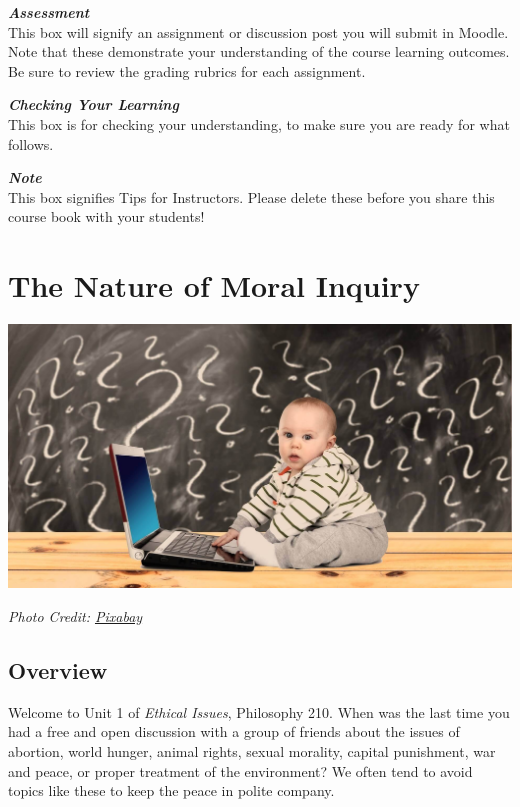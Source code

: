 \documentclass[
]{book}
\begin{document}
\begin{assessment}
\textbf{\emph{Assessment}}\\
This box will signify an assignment or discussion post you will submit in Moodle. Note that these demonstrate your understanding of the course learning outcomes. Be sure to review the grading rubrics for each assignment.
\end{assessment}

\begin{progress}
\textbf{\emph{Checking Your Learning}}\\
This box is for checking your understanding, to make sure you are ready for what follows.
\end{progress}

\begin{feedback}
\textbf{\emph{Note}}\\
This box signifies Tips for Instructors. Please delete these before you share this course book with your students!
\end{feedback}

\hypertarget{the-nature-of-moral-inquiry}{%
\chapter{The Nature of Moral Inquiry}\label{the-nature-of-moral-inquiry}}

\includegraphics{assets/unit_1/U1_baby-2709666_1920.jpg}

\emph{Photo Credit: \href{https://pixabay.com/en/baby-learn-laptop-question-2709666/}{Pixabay}}

\hypertarget{overview}{%
\section{Overview}\label{overview}}

Welcome to Unit 1 of \emph{Ethical Issues}, Philosophy 210. When was the last time you had a free and open discussion with a group of friends about the issues of abortion, world hunger, animal rights, sexual morality, capital punishment, war and peace, or proper treatment of the environment? We often tend to avoid topics like these to keep the peace in polite company.
\end{document}
